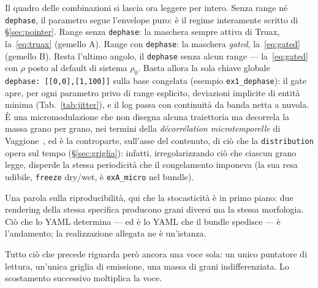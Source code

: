 Il quadro delle combinazioni si lascia ora leggere per intero. Senza
range né \texttt{dephase}, il parametro segue l'envelope puro: è il regime
interamente scritto di \S\ref{sec:pointer}. Range senza \texttt{dephase}:
la maschera sempre attiva di Truax, la~\eqref{eq:truax} (gemello A). Range
con \texttt{dephase}: la maschera \emph{gated}, la~\eqref{eq:gated}
(gemello B). Resta l'ultimo angolo, il \texttt{dephase} senza alcun range
--- la~\eqref{eq:gated} con $\rho$ posto al default di sistema $\rho_0$.
Basta allora la sola chiave globale \texttt{dephase:\ [[0,0],[1,100]]}
sulla base congelata (esempio \texttt{ex1\_dephase}): il gate apre, per
ogni parametro privo di range esplicito, deviazioni implicite di entità
minima (Tab.~\ref{tab:jitter}), e il log passa con continuità da banda
netta a nuvola. È una micromodulazione che non disegna alcuna traiettoria
ma decorrela la massa grano per grano, nei termini della
\emph{décorrélation microtemporelle} di Vaggione~\cite{Vaggione2002}, ed è
la controparte, sull'asse del contenuto, di ciò che la \texttt{distribution}
opera sul tempo (\S\ref{sec:griglia}): infatti, irregolarizzando ciò che
ciascun grano legge, disperde la stessa periodicità che il congelamento
imponeva (la sua resa udibile, \texttt{freeze} dry/wet, è
\texttt{exA\_micro} nel bundle).

\begin{table}[h]
  \centering
  \label{tab:jitter}
  
\end{table}

Una parola sulla riproducibilità, qui che la stocasticità è in primo
piano: due rendering della stessa specifica producono grani diversi ma la
stessa morfologia. Ciò che lo YAML determina --- ed è lo YAML che il
bundle spedisce --- è l'andamento; la realizzazione allegata ne è
un'istanza.

Tutto ciò che precede riguarda però ancora una voce sola: un unico
puntatore di lettura, un'unica griglia di emissione, una massa di grani
indifferenziata. Lo scostamento successivo moltiplica la voce.